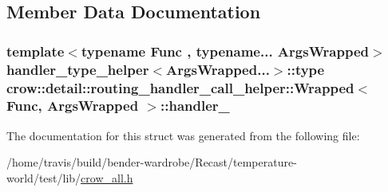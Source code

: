 \subsection{Member Data Documentation}
\hypertarget{structcrow_1_1detail_1_1routing__handler__call__helper_1_1_wrapped_ab8030d2b00c5a3f90c269423e1d26efe}{
\subsubsection[{handler\-\_\-}]{\setlength{\rightskip}{0pt plus 5cm}template$<$typename Func , typename... Args\-Wrapped$>$ {\bf handler\-\_\-type\-\_\-helper}$<$Args\-Wrapped...$>$\-::type {\bf crow\-::detail\-::routing\-\_\-handler\-\_\-call\-\_\-helper\-::\-Wrapped}$<$ Func, Args\-Wrapped $>$\-::handler\-\_\-}}\label{structcrow_1_1detail_1_1routing__handler__call__helper_1_1_wrapped_ab8030d2b00c5a3f90c269423e1d26efe}


The documentation for this struct was generated from the following file\-:\begin{DoxyCompactItemize}
\item 
/home/travis/build/bender-\/wardrobe/\-Recast/temperature-\/world/test/lib/\hyperlink{crow__all_8h}{crow\-\_\-all.\-h}\end{DoxyCompactItemize}
